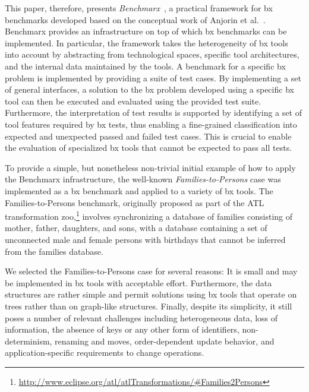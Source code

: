 This paper, therefore, presents \emph{Benchmarx}~\cite{Anjorin2017}, a practical framework for bx benchmarks developed based on the conceptual work of Anjorin et al.~\cite{AnjorinCG0RS14}.
Benchmarx provides an infrastructure on top of which bx benchmarks can be implemented. 
In particular, the framework takes the heterogeneity of bx tools into account by abstracting from technological spaces, specific tool architectures, and the internal data maintained by the tools. 
A benchmark for a specific bx problem is implemented by providing a suite of test cases. 
By implementing a set of general interfaces, a solution to the bx problem developed using a specific bx tool can then be executed and evaluated using the provided test suite.  
Furthermore, the interpretation of test results is supported by identifying a set of tool features required by bx tests, thus enabling a fine-grained classification into expected and unexpected passed and failed test cases.
This is crucial to enable the evaluation of specialized bx tools that cannot be expected to pass all tests.

To provide a simple, but nonetheless non-trivial initial example of how to apply the Benchmarx infrastructure, the well-known \emph{Families-to-Persons} case was implemented as a bx benchmark and applied to a variety of bx tools. 
The Families-to-Persons benchmark, originally proposed as part of the ATL~\cite{SCP-Jouault2008} transformation zoo,\footnote{\url{http://www.eclipse.org/atl/atlTransformations/\#Families2Persons}} involves synchronizing a database of families consisting of mother, father, daughters, and sons, with a database containing a set of unconnected male and female persons with birthdays that cannot be inferred from the families database. 

We selected the Families-to-Persons case for several reasons: It is small and may be implemented in bx tools with acceptable effort. Furthermore, the data structures are rather simple and permit solutions using bx tools that operate on trees rather than on graph-like structures. 
Finally, despite its simplicity, it still poses a number of relevant challenges including heterogeneous data, loss of information, the absence of keys or any other form of identifiers, non-determinism, renaming and moves, order-dependent update behavior, and application-specific requirements to change operations.


